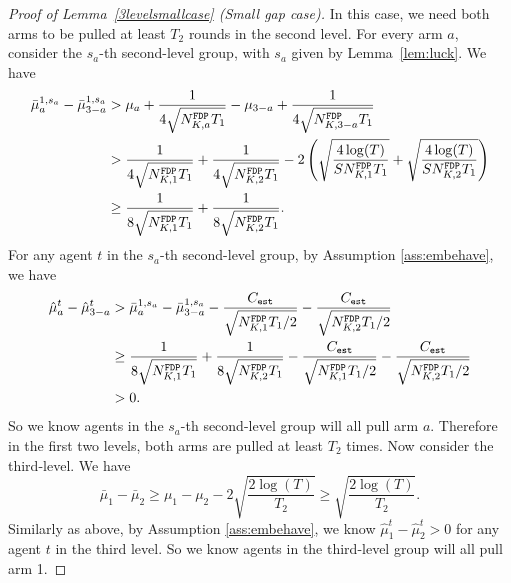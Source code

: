 \begin{proof}[Proof of Lemma~\ref{3levelsmallcase} (Small gap case)]
  In this case, we need both arms to be pulled at least $T_2$ rounds
  in the second level. For every arm $a$, consider the $s_a$-th
  second-level group, with $s_a$ given by Lemma~\ref{lem:luck}. We
  have
\begin{align*}
\bar{\mu}_a^{1,s_a} - \bar{\mu}_{3-a}^{1,s_a} &> \mu_a + \frac{1}{4\sqrt{\fdpN T_1}} -\mu_{3-a} +\frac{1}{4\sqrt{\fdpN[3-a]T_1}} \\
&> \frac{1}{4\sqrt{\fdpN[1]T_1}}+ \frac{1}{4\sqrt{\fdpN[2]T_1}} - 2\left(\sqrt{\frac{4\log(T)}{S\fdpN[1]T_1}}
+ \sqrt{\frac{4\log(T)}{S\fdpN[2]T_1}}\right) \\
&\geq \frac{1}{8\sqrt{\fdpN[1]T_1}}+ \frac{1}{8\sqrt{\fdpN[2]T_1}}.
\end{align*}
For any agent $t$ in the $s_a$-th second-level group, by Assumption \ref{ass:embehave}, we have
\begin{align*}
\hat{\mu}_a^t - \hat{\mu}_{3-a}^t &>\bar{\mu}_a^{1,s_a} - \bar{\mu}_{3-a}^{1,s_a} - \frac{\estC}{\sqrt{\fdpN[1]T_1/2}} - \frac{\estC}{\sqrt{\fdpN[2]T_1/2}}\\
&\geq   \frac{1}{8\sqrt{\fdpN[1]T_1}}+ \frac{1}{8\sqrt{\fdpN[2]T_1}}- \frac{\estC}{\sqrt{\fdpN[1]T_1/2}} - \frac{\estC}{\sqrt{\fdpN[2]T_1/2}}\\
 &> 0.
\end{align*}
So we know agents in the $s_a$-th second-level group will all pull arm $a$. Therefore in the first two levels, both arms are pulled at least $T_2$ times. Now consider the third-level. We have
\[
\bar{\mu}_1 - \bar{\mu}_2  \geq \mu_1 -\mu_2 - 2\sqrt{\frac{2\log(T)}{T_2}} \geq \sqrt{\frac{2\log(T)}{T_2}}.
\]
Similarly as above, by Assumption \ref{ass:embehave}, we know $\hat{\mu}_1^t - \hat{\mu}_2^t > 0$ for any agent $t$ in the third level. So we know agents in the third-level group will all pull arm 1.
\end{proof} 